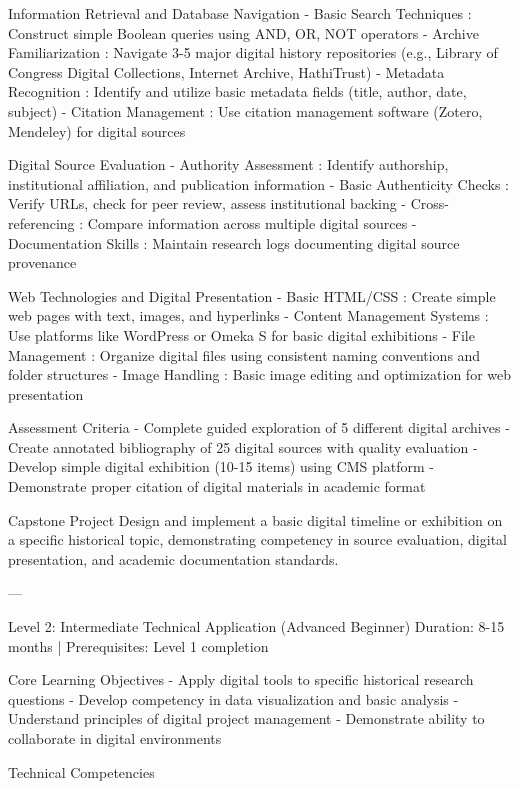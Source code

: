 \begin{appendices}
     Information Retrieval and Database Navigation
-  Basic Search Techniques : Construct simple Boolean queries using AND, OR, NOT operators
-  Archive Familiarization : Navigate 3-5 major digital history repositories (e.g., Library of Congress Digital Collections, Internet Archive, HathiTrust)
-  Metadata Recognition : Identify and utilize basic metadata fields (title, author, date, subject)
-  Citation Management : Use citation management software (Zotero, Mendeley) for digital sources

     Digital Source Evaluation
-  Authority Assessment : Identify authorship, institutional affiliation, and publication information
-  Basic Authenticity Checks : Verify URLs, check for peer review, assess institutional backing
-  Cross-referencing : Compare information across multiple digital sources
-  Documentation Skills : Maintain research logs documenting digital source provenance

     Web Technologies and Digital Presentation
-  Basic HTML/CSS : Create simple web pages with text, images, and hyperlinks
-  Content Management Systems : Use platforms like WordPress or Omeka S for basic digital exhibitions
-  File Management : Organize digital files using consistent naming conventions and folder structures
-  Image Handling : Basic image editing and optimization for web presentation

    Assessment Criteria
- Complete guided exploration of 5 different digital archives
- Create annotated bibliography of 25 digital sources with quality evaluation
- Develop simple digital exhibition (10-15 items) using CMS platform
- Demonstrate proper citation of digital materials in academic format

    Capstone Project
Design and implement a basic digital timeline or exhibition on a specific historical topic, demonstrating competency in source evaluation, digital presentation, and academic documentation standards.

---

   Level 2: Intermediate Technical Application (Advanced Beginner)
 Duration: 8-15 months | Prerequisites: Level 1 completion 

    Core Learning Objectives
- Apply digital tools to specific historical research questions
- Develop competency in data visualization and basic analysis
- Understand principles of digital project management
- Demonstrate ability to collaborate in digital environments

    Technical Competencies


\end{appendices}

